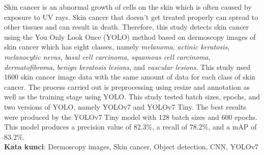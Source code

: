 \documentclass[]{mathuinsa}
\begin{document}
    
    \begin{abstracteng}
        Skin cancer is an abnormal growth of cells on the skin which is often caused by exposure to UV rays. Skin cancer that doesn't get treated properly can spread to other tissues and can result in death. Therefore, this study detects skin cancer using the You Only Look Once (YOLO) method based on dermoscopy images of skin cancer which has eight classes, namely \textit{melanoma}, \textit{actinic keratosis}, \textit{melanocytic nevus}, \textit{basal cell carcinoma}, \textit{squamous cell carcinoma}, \textit{dermatofibroma}, \textit{benign keratosis lesions}, and \textit{vascular lesions}. This study used 1600 skin cancer image data with the same amount of data for each class of skin cancer. The process carried out is preprocessing using resize and annotation as well as the training stage using YOLO. This study tested batch sizes, epochs, and two versions of YOLO, namely YOLOv7 and YOLOv7 Tiny. The best results were produced by the YOLOv7 Tiny model with 128 batch sizes and 600 epochs. This model produces a precision value of 82.3\%, a recall of 78.2\%, and a mAP of 83.2\%.\\
        \noindent
        \textbf{Kata kunci}: Dermoscopy images, Skin cancer, Object detection, CNN, YOLOv7
    \end{abstracteng}

    
    
    
    
    


    


    \appendix
    \label{appendix: filter}
\end{document}
